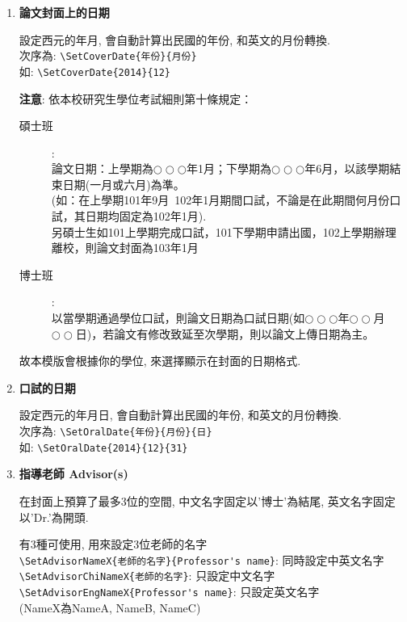 \begin{enumerate}
  \item
  {
    \textbf{論文封面上的日期}

    設定西元的年月, 會自動計算出民國的年份, 和英文的月份轉換.\\
    次序為: \verb|\SetCoverDate{年份}{月份}|\\
    如: \verb|\SetCoverDate{2014}{12}|

    \textbf{注意}: 依本校研究生學位考試細則第十條規定：
      \begin{description}
        \item[碩士班]: \hfill\\
          論文日期：上學期為$\bigcirc\bigcirc\bigcirc$年1月；下學期為$\bigcirc\bigcirc\bigcirc$年6月，以該學期結束日期(一月或六月)為準。\\
          (如：在上學期101年9月~102年1月期間口試，不論是在此期間何月份口試，其日期均固定為102年1月).\\
          另碩士生如101上學期完成口試，101下學期申請出國，102上學期辦理離校，則論文封面為103年1月

        \item[博士班]: \hfill\\
        以當學期通過學位口試，則論文日期為口試日期(如$\bigcirc\bigcirc\bigcirc$年$\bigcirc\bigcirc$月$\bigcirc\bigcirc$日)，若論文有修改致延至次學期，則以論文上傳日期為主。
      \end{description}
    故本模版會根據你的學位, 來選擇顯示在封面的日期格式.
  } %

  \item
  {
    \textbf{口試的日期}

    設定西元的年月日, 會自動計算出民國的年份, 和英文的月份轉換.\\
    次序為: \verb|\SetOralDate{年份}{月份}{日}|\\
    如: \verb|\SetOralDate{2014}{12}{31}|
  } %

  \item
  {
    \textbf{指導老師 Advisor(s)}

    在封面上預算了最多3位的空間, 中文名字固定以'博士'為結尾, 英文名字固定以'Dr.'為開頭.

    有3種可使用, 用來設定3位老師的名字\\
    \verb|\SetAdvisorNameX{老師的名字}{Professor's name}|: 同時設定中英文名字\\
    \verb|\SetAdvisorChiNameX{老師的名字}|: 只設定中文名字\\
    \verb|\SetAdvisorEngNameX{Professor's name}|: 只設定英文名字\\
    (NameX為NameA, NameB, NameC)

}
\end{enumerate}

